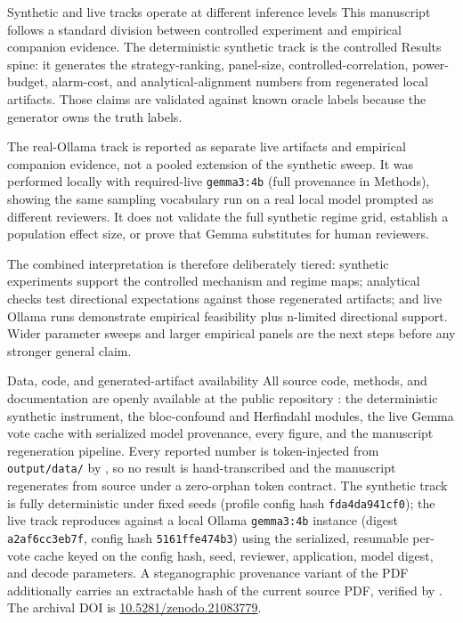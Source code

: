 \documentclass[
  ignorenonframetext,
]{beamer}
\begin{document}
\begin{frame}{Synthetic and live tracks
operate at different inference levels}
\protect{}\label{synthetic-and-live-tracks-operate-at-different-inference-levels}
This manuscript follows a standard division between controlled
experiment and empirical companion evidence. The deterministic synthetic
track is the controlled Results spine: it generates the
strategy-ranking, panel-size, controlled-correlation, power-budget,
alarm-cost, and analytical-alignment numbers from regenerated local
artifacts. Those claims are validated against known oracle labels
because the generator owns the truth labels.

The real-Ollama track is reported as separate live artifacts and
empirical companion evidence, not a pooled extension of the synthetic
sweep. It was performed locally with required-live \texttt{gemma3:4b}
(full provenance in Methods), showing the same sampling vocabulary run
on a real local model prompted as different reviewers. It does not
validate the full synthetic regime grid, establish a population effect
size, or prove that Gemma substitutes for human reviewers.

The combined interpretation is therefore deliberately tiered: synthetic
experiments support the controlled mechanism and regime maps; analytical
checks test directional expectations against those regenerated
artifacts; and live Ollama runs demonstrate empirical feasibility plus
n-limited directional support. Wider parameter sweeps and larger
empirical panels are the next steps before any stronger general claim.
\end{frame}

\begin{frame}{Data, code, and
generated-artifact availability}
\protect{}\label{data-code-and-generated-artifact-availability}
All source code, methods, and documentation are openly available at the
public repository
\href{https://github.com/docxology/ntqr_allotment}{}:
the deterministic synthetic instrument, the bloc-confound and Herfindahl
modules, the live Gemma vote cache with serialized model provenance,
every figure, and the manuscript regeneration pipeline. Every reported
number is token-injected from \texttt{output/data/} by
, so no result is
hand-transcribed and the manuscript regenerates from source under a
zero-orphan token contract. The synthetic track is fully deterministic
under fixed seeds (profile config hash \texttt{fda4da941cf0}); the live
track reproduces against a local Ollama \texttt{gemma3:4b} instance
(digest \texttt{a2af6cc3eb7f}, config hash \texttt{5161ffe474b3}) using
the serialized, resumable per-vote cache keyed on the config hash, seed,
reviewer, application, model digest, and decode parameters. A
steganographic provenance variant of the PDF additionally carries an
extractable hash of the current source PDF, verified by
. The archival DOI is
\href{https://doi.org/10.5281/zenodo.21083779}{10.5281/zenodo.21083779}.
\end{frame}
\end{document}
